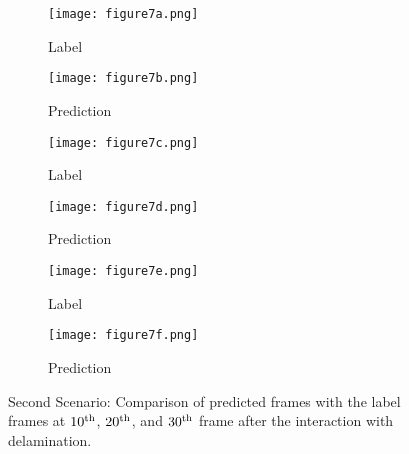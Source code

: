 \begin{figure} []
	\centering
	\begin{subfigure}[b]{0.44\textwidth}
		\centering
		\texttt{[image: figure7a.png]}
		\caption{Label}
		\label{fig:num_453_label1}
	\end{subfigure}
	\hfill
	\begin{subfigure}[b]{0.44\textwidth}
		\centering
		\texttt{[image: figure7b.png]} 
		\caption{Prediction}
		\label{fig:num_453_pred1}
	\end{subfigure}
	\hfill
	\begin{subfigure}[b]{0.44\textwidth}
		\centering
		\texttt{[image: figure7c.png]}
		\caption{Label}
		\label{fig:num_453_label2}
	\end{subfigure}
	\hfill
	\begin{subfigure}[b]{0.44\textwidth}
		\centering
		\texttt{[image: figure7d.png]}
		\caption{Prediction}
		\label{fig:num_453_pred2}
	\end{subfigure}
	\hfill
	\begin{subfigure}[b]{0.44\textwidth}
		\centering
		\texttt{[image: figure7e.png]}
		\caption{Label}
		\label{fig:num_453_label3}
	\end{subfigure}
	\hfill	
	\begin{subfigure}[b]{0.44\textwidth}
		\centering
		\texttt{[image: figure7f.png]}
		\caption{Prediction}
		\label{fig:num_453_pred3}
	\end{subfigure}
	\hfill	
	\caption{Second Scenario: Comparison of predicted frames with the label 
		frames at $10\textsuperscript{th}$, $20\textsuperscript{th}$, and 
		$30\textsuperscript{th}$ frame after the interaction with delamination.}
	\label{fig:num_453}
\end{figure}
